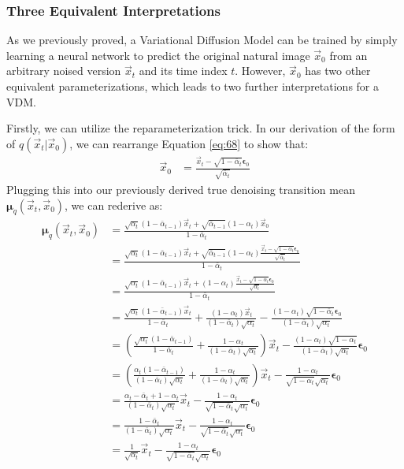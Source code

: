 \subsubsection*{Three Equivalent Interpretations}
%
As we previously proved, a Variational Diffusion Model can be trained by simply learning a neural network to predict the original natural image $\vec{x}_0$ from an arbitrary noised version $\vec{x}_t$ and its time index $t$.  However, $\vec{x}_0$ has two other equivalent parameterizations, which leads to two further interpretations for a VDM.

Firstly, we can utilize the reparameterization trick.  In our derivation of the form of $q(\vec{x}_t|\vec{x}_0)$, we can rearrange Equation \ref{eq:68} to show that:
\begin{align}
\vec{x}_0 &= \frac{\vec{x}_t - \sqrt{1 - \bar\alpha_t}\bm{\epsilon}_0}{\sqrt{\bar\alpha_t}} \label{eq:62}
\end{align}
Plugging this into our previously derived true denoising transition mean $\bm{\mu}_q(\vec{x}_t, \vec{x}_0)$, we can rederive as:
\begingroup
\allowdisplaybreaks
\begin{align}
\bm{\mu}_q(\vec{x}_t, \vec{x}_0) &= \frac{\sqrt{\alpha_t}(1-\bar\alpha_{t-1})\vec{x}_{t} + \sqrt{\bar\alpha_{t-1}}(1-\alpha_t)\vec{x}_0}{1 -\bar\alpha_{t}}\\
&= \frac{\sqrt{\alpha_t}(1-\bar\alpha_{t-1})\vec{x}_{t} + \sqrt{\bar\alpha_{t-1}}(1-\alpha_t)\frac{\vec{x}_t - \sqrt{1 - \bar\alpha_t}\bm{\epsilon}_0}{\sqrt{\bar\alpha_t}}}{1 -\bar\alpha_{t}}\\
&= \frac{\sqrt{\alpha_t}(1-\bar\alpha_{t-1})\vec{x}_{t} + (1-\alpha_t)\frac{\vec{x}_t - \sqrt{1 - \bar\alpha_t}\bm{\epsilon}_0}{\sqrt{\alpha_t}}}{1 -\bar\alpha_{t}}\\
&= \frac{\sqrt{\alpha_t}(1-\bar\alpha_{t-1})\vec{x}_{t}}{1 - \bar\alpha_t} + \frac{(1-\alpha_t)\vec{x}_t}{(1-\bar\alpha_t)\sqrt{\alpha_t}} - \frac{(1 - \alpha_t)\sqrt{1 - \bar\alpha_t}\bm{\epsilon}_0}{(1-\bar\alpha_t)\sqrt{\alpha_t}}\\
&= \left(\frac{\sqrt{\alpha_t}(1-\bar\alpha_{t-1})}{1 - \bar\alpha_t} + \frac{1-\alpha_t}{(1-\bar\alpha_t)\sqrt{\alpha_t}}\right)\vec{x}_t - \frac{(1 - \alpha_t)\sqrt{1 - \bar\alpha_t}}{(1-\bar\alpha_t)\sqrt{\alpha_t}}\bm{\epsilon}_0\\
&= \left(\frac{\alpha_t(1-\bar\alpha_{t-1})}{(1 - \bar\alpha_t)\sqrt{\alpha_t}} + \frac{1-\alpha_t}{(1-\bar\alpha_t)\sqrt{\alpha_t}}\right)\vec{x}_t - \frac{1 - \alpha_t}{\sqrt{1 - \bar\alpha_t}\sqrt{\alpha_t}}\bm{\epsilon}_0\\
&= \frac{\alpha_t-\bar\alpha_{t} + 1-\alpha_t}{(1 - \bar\alpha_t)\sqrt{\alpha_t}}\vec{x}_t - \frac{1 - \alpha_t}{\sqrt{1 - \bar\alpha_t}\sqrt{\alpha_t}}\bm{\epsilon}_0\\
&= \frac{1-\bar\alpha_t}{(1 - \bar\alpha_t)\sqrt{\alpha_t}}\vec{x}_t - \frac{1 - \alpha_t}{\sqrt{1 - \bar\alpha_t}\sqrt{\alpha_t}}\bm{\epsilon}_0\\
&= \frac{1}{\sqrt{\alpha_t}}\vec{x}_t - \frac{1 - \alpha_t}{\sqrt{1 - \bar\alpha_t}\sqrt{\alpha_t}}\bm{\epsilon}_0
\end{align}
